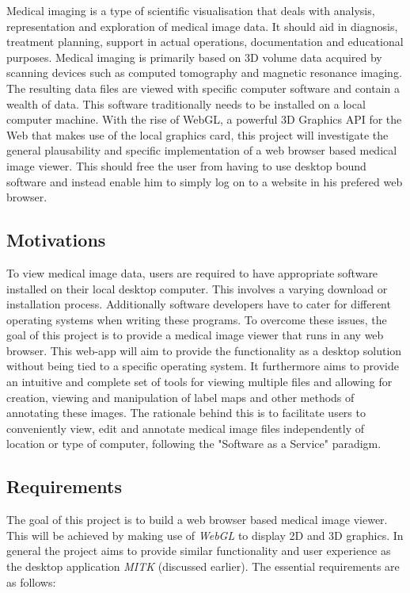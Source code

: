 \documentclass[a4paper,11pt,twoside]{article}
\begin{document}
Medical imaging is a type of scientific visualisation that deals with analysis, representation and exploration of medical image data. It should aid in diagnosis, treatment planning, support in actual operations, documentation and educational purposes. Medical imaging is primarily based on 3D volume data acquired by scanning devices such as computed tomography and magnetic resonance imaging. The resulting data files are viewed with specific computer software and contain a wealth of data. This software traditionally needs to be installed on a local computer machine. With the rise of WebGL, a powerful 3D Graphics API for the Web that makes use of the local graphics card, this project will investigate the general plausability and specific implementation of a web browser based medical image viewer. This should free the user from having to use desktop bound software and instead enable him to simply log on to a website in his prefered web browser.

\subsection{Motivations}

To view medical image data, users are required to have appropriate software installed on their local desktop computer. This involves a varying download or installation process. Additionally software developers have to cater for different operating systems when writing these programs. To overcome these issues, the goal of this project is to provide a medical image viewer that runs in any web browser. This web-app will aim to provide the functionality as a desktop solution without being tied to a specific operating system. It furthermore aims to provide an intuitive and complete set of tools for viewing multiple files and allowing for creation, viewing and manipulation of label maps and other methods of annotating these images. The rationale behind this is to facilitate users to conveniently view, edit and annotate medical image files independently of location or type of computer, following the "Software as a Service" paradigm.


\subsection{Requirements}


The goal of this project is to build a web browser based medical image viewer. This will be achieved by making use of \textit{WebGL} to display 2D and 3D graphics. In general the project aims to provide similar functionality and user experience as the desktop application \textit{MITK} (discussed earlier). The essential requirements are as follows:
\end{document}

